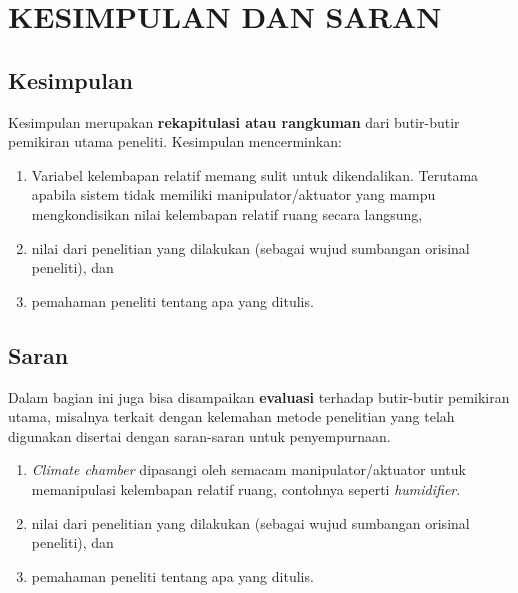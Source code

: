\chapter{KESIMPULAN DAN SARAN}
\label{kesimpulan-dan-saran}



\section{Kesimpulan}


Kesimpulan merupakan \textbf{rekapitulasi atau rangkuman} dari butir-butir pemikiran utama peneliti. Kesimpulan mencerminkan:
 \begin{enumerate}
 	\item Variabel kelembapan relatif memang sulit untuk dikendalikan. Terutama apabila sistem tidak memiliki manipulator/aktuator yang mampu mengkondisikan nilai kelembapan relatif ruang secara langsung,
 	\item nilai dari penelitian yang dilakukan (sebagai wujud sumbangan orisinal peneliti), dan
 	\item pemahaman peneliti tentang apa yang ditulis.
 \end{enumerate}
 


\section{Saran}

Dalam bagian ini juga bisa disampaikan \textbf{evaluasi} terhadap butir-butir pemikiran utama, misalnya terkait dengan kelemahan metode penelitian yang telah digunakan disertai dengan saran-saran untuk penyempurnaan.
\begin{enumerate}
	\item \textit{Climate chamber} dipasangi oleh semacam manipulator/aktuator untuk memanipulasi kelembapan relatif ruang, contohnya seperti \textit{humidifier}.
	\item nilai dari penelitian yang dilakukan (sebagai wujud sumbangan orisinal peneliti), dan
	\item pemahaman peneliti tentang apa yang ditulis.
\end{enumerate}

